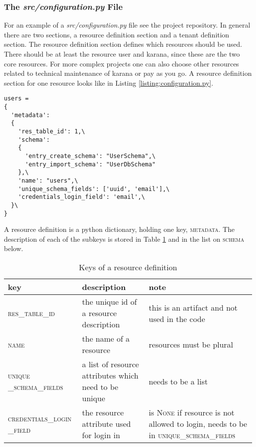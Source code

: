 \subsubsection{The \textit{src/configuration.py} File}

For an example  of a \textit{src/configuration.py} file see the project repository. In general there are two sections, a resource definition section and a tenant definition section. The resource definition section defines which resources should be used. There should be at least the resource user and karana, since these are the two core resources. For more complex projects one can also choose other resources related to technical maintenance of karana or pay as you go. A resource definition section for one resource looks like in Listing \ref{listing:configuration.py}.
\lstset{language=Python}  
\begin{lstlisting}[caption={Example for a resource definiton in the \textit{src/configuration.py} file, here for the user resource},label={listing:configuration.py}]
users = 
{
  'metadata': 
  {
    'res_table_id': 1,\
    'schema': 
    {
      'entry_create_schema': "UserSchema",\
      'entry_import_schema': "UserDbSchema"
	},\
    'name': "users",\
    'unique_schema_fields': ['uuid', 'email'],\
    'credentials_login_field': 'email',\
  }\
}
\end{lstlisting}
A resource definition is a python dictionary, holding one key, \textsc{metadata}. The description of each of the subkeys is stored in Table \ref{table:configuration.py} and in the list on \textsc{schema} below.
\begin{table}
\begin{tabular}{ p{3cm}| p{4cm} | p{4cm} }
	key & description & note \\\hline
	 \textsc{res\_table\_id} & the unique id of a resource description & this is an artifact and not used in the code \\\hline
	\textsc{name} & the name of a resource  & resources must be plural \\	\hline
	\textsc{unique} \textsc{\_schema\_fields} & a list of resource attributes which need to be unique  & needs to be a list  \\\hline
	\textsc{credentials\_login} \textsc{\_field} & the  resource attribute  used for login in  & is \textsc{None} if resource is not allowed to login, needs to be in \textsc{unique\_schema\_fields}  \\\hline
\end{tabular}
\caption{Keys of a resource definition}\label{table:configuration.py}
\end{table}

